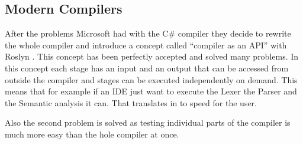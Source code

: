 \subsection{Modern Compilers}
After the problems Microsoft had with the C\# compiler they decide to rewrite the whole compiler and introduce a concept
called “compiler as an API” with Roslyn \cite{dotNet}. This concept has been perfectly accepted and solved many problems.
In this concept each stage has an input and an output that can be accessed from outside the compiler and stages can be
executed independently on demand. This means that for example if an IDE just want to execute the Lexer the Parser and
the Semantic analysis it can. That translates in to speed for the user.

Also the second problem is solved as testing individual parts of the compiler is much more easy than the hole compiler
at once.

